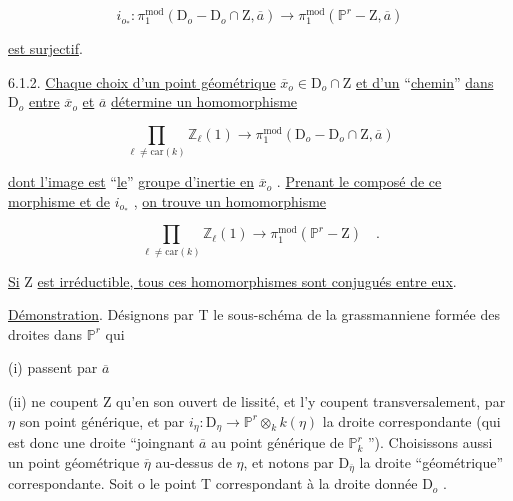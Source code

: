 \begin{equation}\tag{6.1.1.1}
i_{o_*} : \pi_1^{\mathrm{mod}}(\mathrm{D}_o - \mathrm{D}_o \cap \mathrm{Z}, \overline{a}) \longrightarrow \pi_1^{\mathrm{mod}}(\mathbb{P}^r - \mathrm{Z}, \overline{a})
\end{equation}

\underline{est surjectif}.

6.1.2. \underline{Chaque choix d'un point géométrique} $\overline{x}_o \in \mathrm{D}_o \cap \mathrm{Z}$ \underline{et d'un} ``\underline{chemin}'' \underline{dans} $\mathrm{D}_o$ \underline{entre} $\overline{x}_o$ \underline{et} $\overline{a}$ \underline{détermine un homomorphisme}

\begin{equation}\tag{6.1.2.1}
\prod\limits_{\ell \neq \mathrm{car}(k)} \mathbb{Z}_\ell(1) \longrightarrow \pi_1^{\mathrm{mod}}(\mathrm{D}_o - \mathrm{D}_o \cap \mathrm{Z}, \overline{a})
\end{equation}

\underline{dont l'image est} ``\underline{le}'' \underline{groupe d'inertie en} $\overline{x}_o$ . \underline{Prenant le composé de ce morphisme et de} $i_{o_*}$ , \underline{on trouve un homomorphisme}

\begin{equation}\tag{6.1.2.2}
\prod\limits_{\ell \neq \mathrm{car}(k)} \mathbb{Z}_\ell(1) \longrightarrow \pi_1^{\mathrm{mod}}(\mathbb{P}^r - \mathrm{Z}) \quad .
\end{equation}

\underline{Si} Z \underline{est irréductible, tous ces homomorphismes sont conjugués entre eux}.

\underline{Démonstration}. Désignons par T le sous-schéma de la grassmanniene formée des droites dans $\mathbb{P}^r$ qui

(i) passent par $\overline{a}$

(ii) ne coupent Z qu'en son ouvert de lissité, et l'y coupent transversalement, par $\eta$ son point générique, et par $i_\eta : \mathrm{D}_\eta \longrightarrow \mathbb{P}^r \otimes_k k(\eta)$ la droite correspondante (qui est donc une droite ``joingnant $\overline{a}$ au point générique de $\mathbb{P}^r_k$ ''). Choisissons aussi un point géométrique $\overline{\eta}$ au-dessus de $\eta$, et notons par $\mathrm{D}_{\overline{\eta}}$ la droite ``géométrique'' correspondante. Soit o le point T correspondant à la droite donnée $\mathrm{D}_o$ .



